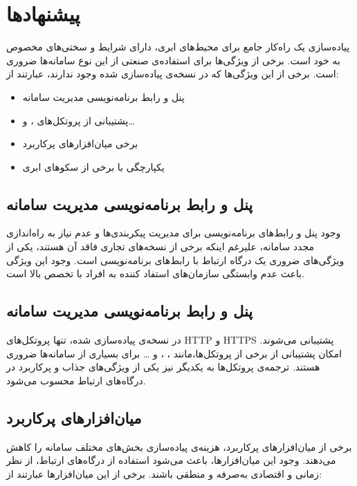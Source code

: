 \section{پیشنهاد‌ها}\label{sec:recom}
پیاده‌سازی یک راه‌کار جامع برای محیط‌های ابری، دارای شرایط و سختی‌های مخصوص به خود است. برخی از ویژگی‌ها برای استفاده‌ی صنعتی از این نوع سامانه‌ها ضروری است. برخی از این ویژگی‌ها که در نسخه‌ی پیاده‌سازی شده وجود ندارند، عبارتند از:

\begin{itemize}
    \item پنل و رابط برنامه‌نویسی مدیریت سامانه
    \item پشتیبانی از پروتکل‌های ،  و\ldots
    \item برخی میان‌افزار‌های پرکاربرد
    \item یکپارچگی با برخی از سکو‌های ابری
\end{itemize}

\subsection{پنل و رابط برنامه‌نویسی مدیریت سامانه}\label{subsec:recom_panel}
وجود پنل و رابط‌های برنامه‌نویسی برای مدیریت پیکر‌بندی‌ها و عدم نیاز به راه‌اندازی مجدد سامانه، علیرغم اینکه برخی از نسخه‌های تجاری فاقد آن هستند، یکی از ویژگی‌های ضروری یک درگاه ارتباط با رابط‌های برنامه‌نویسی است. وجود این ویژگی باعث عدم وابستگی سازمان‌های استفاد کننده به افراد با تخصص بالا است.

\subsection{پنل و رابط برنامه‌نویسی مدیریت سامانه}\label{subsec:recom_protocols}
در نسخه‌ی پیاده‌سازی شده، تنها پروتکل‌های HTTP و HTTPS پشتیبانی می‌شوند. امکان پشتیبانی از برخی از پروتکل‌ها،‌مانند ، ،  و … برای بسیاری از سامانه‌ها ضروری هستند.
ترجمه‌ی پروتکل‌ها به یکدیگر نیز یکی از ویژگی‌های جذاب و پرکاربرد در درگاه‌های ارتباط محسوب می‌شود.

\subsection{میان‌افزار‌های پرکاربرد}\label{subsec:recom_middlewares}
برخی از میان‌افزار‌های پرکاربرد، هزینه‌ی پیاده‌سازی بخش‌های مختلف سامانه را کاهش می‌دهند. وجود این میان‌افزار‌ها، باعث می‌شود استفاده از درگاه‌های ارتباط، از نظر زمانی و اقتصادی به‌صرفه‌ و منطقی باشند. برخی از این میان‌افزار‌ها عبارتند از:

